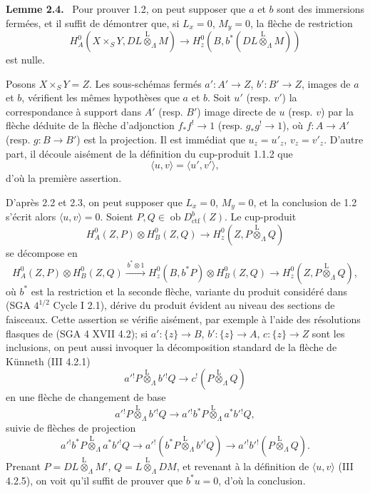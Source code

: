 \documentclass[11pt]{article}
\newenvironment{statement}[1]{\par\medskip\noindent\textbf{#1.}\ }{\par\medskip}
\providecommand{\lten}{\overset{\mathrm L}{\otimes}}
\providecommand{\Ob}{\operatorname{ob}}
\providecommand{\lten}{\overset{\mathrm L}{\otimes}}
\providecommand{\lten}{\overset{\mathrm L}{\otimes}}
\providecommand{\Ob}{\operatorname{ob}}
\providecommand{\lten}{\overset{\mathrm L}{\otimes}}
\providecommand{\lten}{\overset{\mathrm L}{\otimes}}
\providecommand{\Ob}{\operatorname{Ob}}
\providecommand{\lten}{\overset{\mathrm L}{\otimes}}
\providecommand{\Ob}{\operatorname{ob}}
\providecommand{\Ob}{\operatorname{Ob}}
\providecommand{\lten}{\overset{\mathrm L}{\otimes}}
\begin{document}
\begin{statement}{Lemme 2.4}
Pour prouver 1.2, on peut supposer que $a$ et $b$ sont des immersions fermées, et il suffit de démontrer que, si $L_x=0$, $M_y=0$, la flèche de restriction
\begin{equation}
H_A^0(X\times_SY,DL\lten_{\Lambda}M)
 \longrightarrow H_z^0(B,b^*(DL\lten_{\Lambda}M))
\tag{2.4.1}
\end{equation}
est nulle.
\end{statement}

Posons $X\times_SY=Z$. Les sous-schémas fermés $a':A'\to Z$, $b':B'\to Z$, images de $a$ et $b$, vérifient les mêmes hypothèses que $a$ et $b$. Soit $u'$ (resp. $v'$) la correspondance à support dans $A'$ (resp. $B'$) image directe de $u$ (resp. $v$) par la flèche déduite de la flèche d'adjonction $f_*f^!\to 1$ (resp. $g_*g^!\to 1$), où $f:A\to A'$ (resp. $g:B\to B'$) est la projection. Il est immédiat que $u_z=u'_z$, $v_z=v'_z$. D'autre part, il découle aisément de la définition du cup-produit 1.1.2 que
\[
\langle u,v\rangle=\langle u',v'\rangle,
\]
d'où la première assertion.

D'après 2.2 et 2.3, on peut supposer que $L_x=0$, $M_y=0$, et la conclusion de 1.2 s'écrit alors $\langle u,v\rangle=0$. Soient $P,Q\in\Ob D_{\mathrm{ctf}}^b(Z)$. Le cup-produit
\[
H_A^0(Z,P)\otimes H_B^0(Z,Q)\longrightarrow H_z^0(Z,P\lten_{\Lambda}Q)
\]
se décompose en
\[
H_A^0(Z,P)\otimes H_B^0(Z,Q)
 \xrightarrow{\,b^*\otimes 1\,}
H_z^0(B,b^*P)\otimes H_B^0(Z,Q)
 \longrightarrow H_z^0(Z,P\lten_{\Lambda}Q),
\]
où $b^*$ est la restriction et la seconde flèche, variante du produit considéré dans (SGA $4^{1/2}$ Cycle I 2.1), dérive du produit évident au niveau des sections de faisceaux. Cette assertion se vérifie aisément, par exemple à l'aide des résolutions flasques de (SGA 4 XVII 4.2); si $a':\{z\}\to B$, $b':\{z\}\to A$, $c:\{z\}\to Z$ sont les inclusions, on peut aussi invoquer la décomposition standard de la flèche de Künneth (III 4.2.1)
\[
a'{}^!P\lten_{\Lambda} b'{}^!Q\longrightarrow c^!(P\lten_{\Lambda}Q)
\]
en une flèche de changement de base
\[
a'{}^!P\lten_{\Lambda} b'{}^!Q\longrightarrow a'{}^!b^*P\lten_{\Lambda} a^*b'{}^!Q,
\]
suivie de flèches de projection
\[
a'{}^!b^*P\lten_{\Lambda} a^*b'{}^!Q
 \longrightarrow a'{}^!(b^*P\lten_{\Lambda} b'{}^!Q)
 \longrightarrow a'{}^!b'{}^!(P\lten_{\Lambda}Q).
\]
Prenant $P=DL\lten_{\Lambda}M'$, $Q=L\lten_{\Lambda}DM$, et revenant à la définition de $\langle u,v\rangle$ (III 4.2.5), on voit qu'il suffit de prouver que $b^*u=0$, d'où la conclusion.
\end{document}
